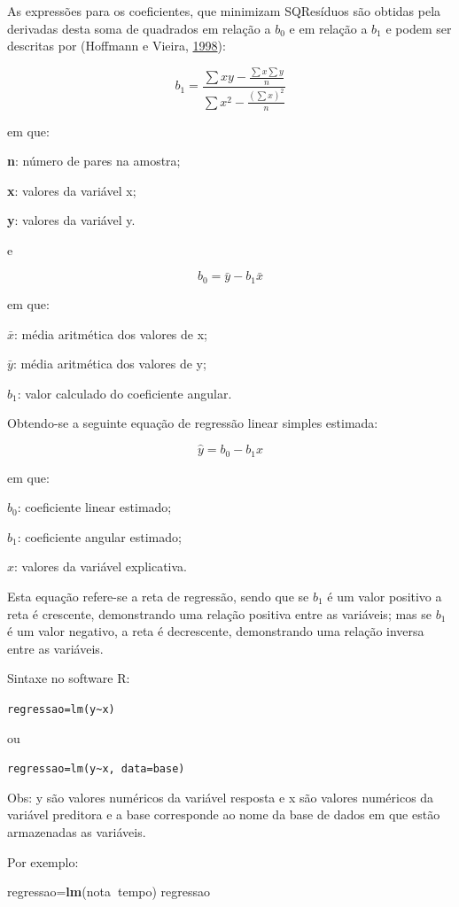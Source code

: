 \documentclass[12pt,brazil,oneside]{book}
\newenvironment{Shaded}{\begin{snugshade}}{\end{snugshade}}
\newcommand{\KeywordTok}[1]{\textcolor[rgb]{0.13,0.29,0.53}{\textbf{#1}}}
\newcommand{\NormalTok}[1]{#1}
\newcommand{\OperatorTok}[1]{\textcolor[rgb]{0.81,0.36,0.00}{\textbf{#1}}}
\begin{document}
As expressões para os coeficientes, que minimizam SQResíduos são obtidas pela derivadas desta soma de quadrados em relação a \(b_0\) e em relação a \(b_1\) e podem ser descritas por (Hoffmann e Vieira, \protect\hyperlink{ref-hoffmann1998}{1998}):

\[
b_1=\frac{\sum xy-\frac{\sum x \sum y}{n}}{\sum x^2 - \frac{(\sum x)^2}{n}}
\]

em que:

\textbf{n}: número de pares na amostra;

\textbf{x}: valores da variável x;

\textbf{y}: valores da variável y.

e

\[
b_0=\bar{y}-b_1\bar{x}
\]

em que:

\(\bar{x}\): média aritmética dos valores de x;

\(\bar{y}\): média aritmética dos valores de y;

\(b_1\): valor calculado do coeficiente angular.

Obtendo-se a seguinte equação de regressão linear simples estimada:

\[
\hat{y}=b_0-b_1{x}
\]

em que:

\(b_0\): coeficiente linear estimado;

\(b_1\): coeficiente angular estimado;

\(x\): valores da variável explicativa.

Esta equação refere-se a reta de regressão, sendo que se \(b_1\) é um valor positivo a reta é crescente, demonstrando uma relação positiva entre as variáveis; mas se \(b_1\) é um valor negativo, a reta é decrescente, demonstrando uma relação inversa entre as variáveis.

Sintaxe no software R:

\texttt{regressao=lm(y\textasciitilde{}x)}

ou

\texttt{regressao=lm(y\textasciitilde{}x,\ data=base)}

Obs: y são valores numéricos da variável resposta e x são valores numéricos da variável preditora e a base corresponde ao nome da base de dados em que estão armazenadas as variáveis.

Por exemplo:

\begin{Shaded}
\begin{Highlighting}[]
\NormalTok{regressao=}\KeywordTok{lm}\NormalTok{(nota}\OperatorTok{~}\NormalTok{tempo)}
\NormalTok{regressao}
\end{Highlighting}
\end{Shaded}
\end{document}

